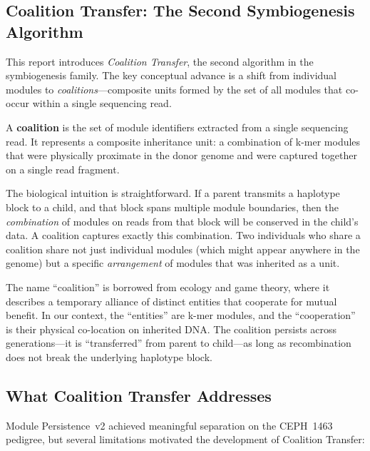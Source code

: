 \documentclass{../yalumba}
\begin{document}
\subsection{Coalition Transfer: The Second Symbiogenesis Algorithm}

This report introduces \emph{Coalition Transfer}, the second algorithm in the
symbiogenesis family.  The key conceptual advance is a shift from individual
modules to \emph{coalitions}---composite units formed by the set of all modules
that co-occur within a single sequencing read.

\begin{definition}
A \textbf{coalition} is the set of module identifiers extracted from a single
sequencing read.  It represents a composite inheritance unit: a combination of
k-mer modules that were physically proximate in the donor genome and were
captured together on a single read fragment.
\end{definition}

The biological intuition is straightforward.  If a parent transmits a haplotype
block to a child, and that block spans multiple module boundaries, then the
\emph{combination} of modules on reads from that block will be conserved in the
child's data.  A coalition captures exactly this combination.  Two individuals
who share a coalition share not just individual modules (which might appear
anywhere in the genome) but a specific \emph{arrangement} of modules that was
inherited as a unit.


The name ``coalition'' is borrowed from ecology and game theory, where it
describes a temporary alliance of distinct entities that cooperate for mutual
benefit.  In our context, the ``entities'' are k-mer modules, and the
``cooperation'' is their physical co-location on inherited DNA.  The coalition
persists across generations---it is ``transferred'' from parent to child---as
long as recombination does not break the underlying haplotype block.

\subsection{What Coalition Transfer Addresses}

Module Persistence~v2 achieved meaningful separation on the CEPH~1463 pedigree,
but several limitations motivated the development of Coalition Transfer:
\end{document}
